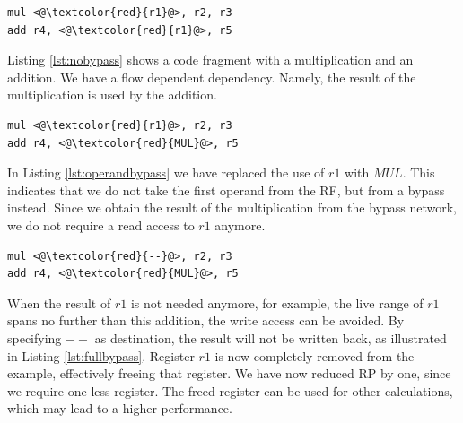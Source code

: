 


\begin{lstlisting}[caption=Example code fragment where no bypassing is specified., label=lst:nobypass]
mul <@\textcolor{red}{r1}@>, r2, r3
add r4, <@\textcolor{red}{r1}@>, r5
\end{lstlisting}

Listing \ref{lst:nobypass} shows a code fragment with a multiplication and an addition. We have a flow dependent dependency. Namely, the result of the multiplication is used by the addition.

\begin{lstlisting}[caption=Example code fragment avoiding a read access., label=lst:operandbypass]
mul <@\textcolor{red}{r1}@>, r2, r3
add r4, <@\textcolor{red}{MUL}@>, r5
\end{lstlisting}

In Listing \ref{lst:operandbypass} we have replaced the use of $r1$ with $MUL$. This indicates that we do not take the first operand from the RF, but from a bypass instead. Since we obtain the result of the multiplication from the bypass network, we do not require a read access to $r1$ anymore.

\begin{lstlisting}[caption=Example code fragment avoiding a read and a write access., label=lst:fullbypass]
mul <@\textcolor{red}{--}@>, r2, r3
add r4, <@\textcolor{red}{MUL}@>, r5
\end{lstlisting}

When the result of $r1$ is not needed anymore, for example, the live range of $r1$ spans no further than this addition, the write access can be avoided. By specifying $--$ as destination, the result will not be written back, as illustrated in Listing \ref{lst:fullbypass}. Register $r1$ is now completely removed from the example, effectively freeing that register. We have now reduced RP by one, since we require one less register. The freed register can be used for other calculations, which may lead to a higher performance.

